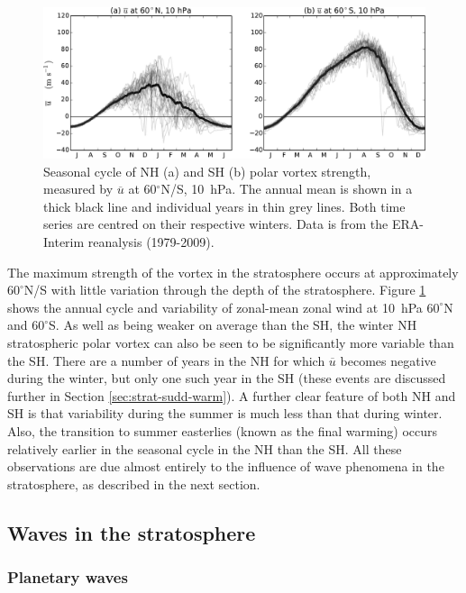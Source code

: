 \begin{figure}
 \centering
 \noindent\includegraphics[width=\textwidth]{figures/chapter-intro/zmzw_NH_SH.pdf}
 \caption[Comparison of NH and SH polar vortex seasonal cycle.]{Seasonal cycle
   of NH (a) and SH (b) polar vortex strength, measured by $\overline{u}$ at
   60$^{\circ}$N/S, 10~hPa. The annual mean is shown in a thick black line and
   individual years in thin grey lines. Both time series are centred on their
   respective winters. Data is from the ERA-Interim reanalysis (1979-2009).}
 \label{fig:zmzw_NH_SH}
\end{figure}

The maximum strength of the vortex in the stratosphere occurs at approximately
$60^{\circ}$N/S with little variation through the depth of the
stratosphere. Figure \ref{fig:zmzw_NH_SH} shows the annual cycle and variability
of zonal-mean zonal wind at 10~hPa $60^{\circ}$N and $60^{\circ}$S. As well as
being weaker on average than the SH, the winter NH stratospheric polar vortex
can also be seen to be significantly more variable than the SH. There are a
number of years in the NH for which $\overline{u}$ becomes negative during the
winter, but only one such year in the SH (these events are discussed further in
Section \ref{sec:strat-sudd-warm}). A further clear feature of both NH and SH is
that variability during the summer is much less than that during winter. Also,
the transition to summer easterlies (known as the final warming) occurs
relatively earlier in the seasonal cycle in the NH than the SH. All these
observations are due almost entirely to the influence of wave phenomena in the
stratosphere, as described in the next section.


\subsection{Waves in the stratosphere}
\label{sec:plan-waves-strat}

\subsubsection{Planetary waves}
\label{sec:planetary-waves}

